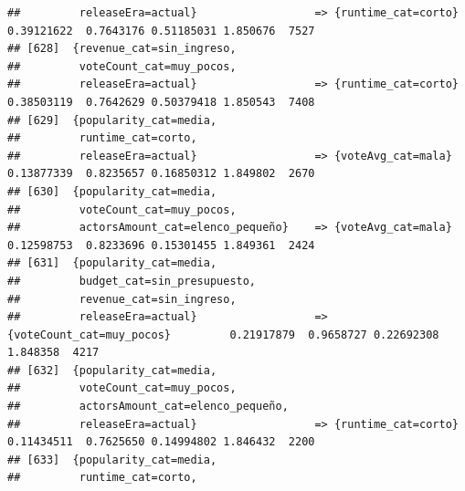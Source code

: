 \documentclass[
]{article}
\begin{document}
\begin{verbatim}
##         releaseEra=actual}                  => {runtime_cat=corto}               0.39121622  0.7643176 0.51185031 1.850676  7527
## [628]  {revenue_cat=sin_ingreso,                                                                                                
##         voteCount_cat=muy_pocos,                                                                                                
##         releaseEra=actual}                  => {runtime_cat=corto}               0.38503119  0.7642629 0.50379418 1.850543  7408
## [629]  {popularity_cat=media,                                                                                                   
##         runtime_cat=corto,                                                                                                      
##         releaseEra=actual}                  => {voteAvg_cat=mala}                0.13877339  0.8235657 0.16850312 1.849802  2670
## [630]  {popularity_cat=media,                                                                                                   
##         voteCount_cat=muy_pocos,                                                                                                
##         actorsAmount_cat=elenco_pequeño}    => {voteAvg_cat=mala}                0.12598753  0.8233696 0.15301455 1.849361  2424
## [631]  {popularity_cat=media,                                                                                                   
##         budget_cat=sin_presupuesto,                                                                                             
##         revenue_cat=sin_ingreso,                                                                                                
##         releaseEra=actual}                  => {voteCount_cat=muy_pocos}         0.21917879  0.9658727 0.22692308 1.848358  4217
## [632]  {popularity_cat=media,                                                                                                   
##         voteCount_cat=muy_pocos,                                                                                                
##         actorsAmount_cat=elenco_pequeño,                                                                                        
##         releaseEra=actual}                  => {runtime_cat=corto}               0.11434511  0.7625650 0.14994802 1.846432  2200
## [633]  {popularity_cat=media,                                                                                                   
##         runtime_cat=corto,                                                                                                      

\end{verbatim}
\end{document}
